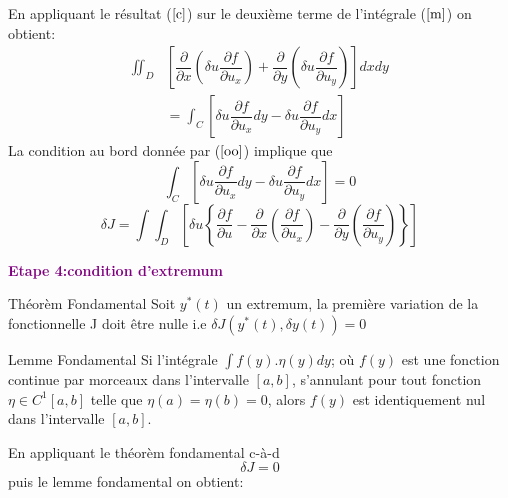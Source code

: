 \documentclass[12pt]{beamer}
\begin{document}
\begin{frame}
En appliquant le r\'{e}sultat ($\ref{c}$) sur le deuxi\`{e}me terme de l'intégrale ($\ref{m}$) on obtient:
\begin{align}
\iint_{D}&\left[ \dfrac{\partial}{\partial{x}}(\delta u\dfrac{\partial{f}}{\partial{u}_{x}})+\dfrac{\partial}{\partial{y}}(\delta u\dfrac{\partial{f}}{\partial{u}_{y}})\right]dxdy\nonumber\\&=\int_{C}\left[ \delta u\dfrac{\partial{f}}{\partial{u}_{x}}dy-\delta u\dfrac{\partial{f}}{\partial{u}_{y}}dx\right]  \label{o} 
\end{align}
La condition au bord donn\'{e}e par ($\ref{oo}$) implique que 
$$
\int_{C}\left[ \delta u\dfrac{\partial{f}}{\partial{u}_{x}}dy-\delta u\dfrac{\partial{f}}{\partial{u}_{y}}dx\right] =0$$
\begin{equation}
\delta J=\int\int_{D}\left[  \delta u\left\lbrace \frac{\partial{f}}{\partial{u}}-\dfrac{\partial}{\partial{x}}(\dfrac{\partial{f}}{\partial{u}_{x}})-\frac{\partial}{\partial{y}}(\dfrac{\partial{f}}{\partial{u}_{y}})\right\rbrace \right]\end{equation}
\end{frame}
\begin{frame}
\textcolor{purple}{
	\textbf{\large{ Etape 4:condition d'extremum}}}
\begin{alertblock}{Th\'{e}or\`{e}m Fondamental}
	Soit $y^{*}(t)$ un extremum, la premi\`{e}re variation de la fonctionnelle J doit \^{e}tre nulle i.e $\delta J(y^{*}(t),\delta y(t))=0$
	
\end{alertblock}
\begin{alertblock}{Lemme Fondamental}
	Si l'intégrale $\int f(y).\eta (y)dy$; o\`{u} $ f(y)$ est une fonction continue par morceaux dans l'intervalle $[a,b]$, s'annulant pour tout fonction $\eta\in C^{1}[a,b]$ telle que $\eta(a)=\eta(b)=0$, alors $f(y)$ est identiquement nul dans l'intervalle $[a,b] $.
	
\end{alertblock}
En appliquant le th\'{e}or\`{e}m fondamental c-\`{a}-d $$\delta J=0$$ puis le lemme fondamental on obtient:\end{frame}
\end{document}
